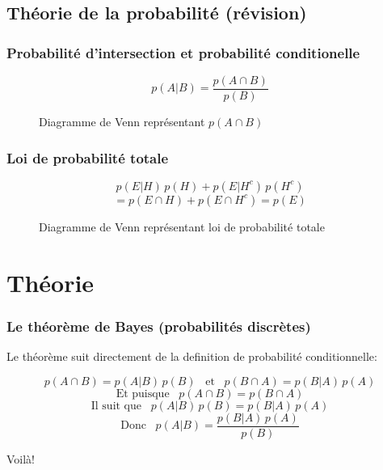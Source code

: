 \documentclass{beamer}
\begin{document}
\subsection{Théorie de la probabilité (révision)}

\begin{frame}
    \frametitle{Probabilité d'intersection et probabilité conditionelle}

    \[p(A | B) = \frac{p(A \cap B)}{p(B)}\]

    \begin{figure}
    \centering
    
    \caption{Diagramme de Venn représentant $p(A \cap B)$}
    \end{figure}
\end{frame}


\begin{frame}
    \frametitle{Loi de probabilité totale}

    \[p(E | H) \, p(H) + p(E | H^c) \, p(H^c)\]
    \[ = p(E \cap H) + p(E \cap H^c) = p(E)\]

    \begin{figure}
    \centering
    
    \caption{Diagramme de Venn représentant loi de probabilité totale}
    \end{figure}
\end{frame}





\section{Théorie}


\begin{frame}
    \frametitle{Le théorème de Bayes (probabilités discrètes)}
    Le théorème suit directement de la definition de probabilité conditionnelle:

    \[p(A \cap B) =  p(A | B) \, p(B) \,\,\, \textrm{ et } \,\,\, p(B \cap A) =  p(B | A) \, p(A)\]
    \[\textrm{Et puisque } \,\,\, p(A \cap B) = p(B \cap A)\]
    \[\textrm{Il suit que } \,\,\, p(A | B) \, p(B) = p(B | A) \, p(A)\]
    \[\textrm{Donc } \,\,\, p(A | B) = \frac{p(B | A) \, p(A)}{p(B)}\]
    
    Voilà!
\end{frame}
\end{document}
